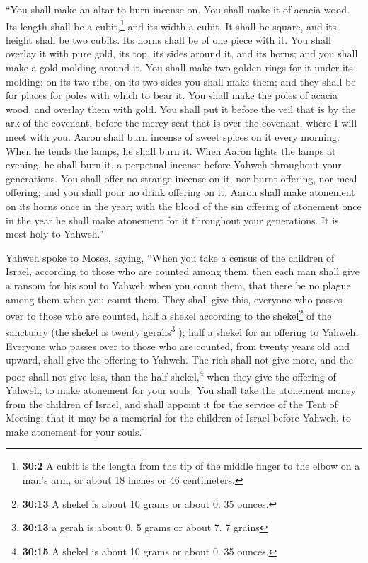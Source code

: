  ``You shall make an altar to burn incense on. You shall
make it of acacia wood.  Its length shall be a
cubit,\footnote{\textbf{30:2} A cubit is the length from the tip of the
  middle finger to the elbow on a man's arm, or about 18 inches or 46
  centimeters.} and its width a cubit. It shall be square, and its
height shall be two cubits. Its horns shall be of one piece with it.
 You shall overlay it with pure gold, its top, its sides
around it, and its horns; and you shall make a gold molding around it.
 You shall make two golden rings for it under its molding;
on its two ribs, on its two sides you shall make them; and they shall be
for places for poles with which to bear it.  You shall
make the poles of acacia wood, and overlay them with gold.
 You shall put it before the veil that is by the ark of
the covenant, before the mercy seat that is over the covenant, where I
will meet with you.  Aaron shall burn incense of sweet
spices on it every morning. When he tends the lamps, he shall burn it.
 When Aaron lights the lamps at evening, he shall burn it,
a perpetual incense before Yahweh throughout your generations.
 You shall offer no strange incense on it, nor burnt
offering, nor meal offering; and you shall pour no drink offering on it.
 Aaron shall make atonement on its horns once in the
year; with the blood of the sin offering of atonement once in the year
he shall make atonement for it throughout your generations. It is most
holy to Yahweh.''

 Yahweh spoke to Moses, saying,  ``When
you take a census of the children of Israel, according to those who are
counted among them, then each man shall give a ransom for his soul to
Yahweh when you count them, that there be no plague among them when you
count them.  They shall give this, everyone who passes
over to those who are counted, half a shekel according to the
shekel\footnote{\textbf{30:13} A shekel is about 10 grams or about 0. 35
  ounces.} of the sanctuary (the shekel is twenty gerahs\footnote{\textbf{30:13}
  a gerah is about 0. 5 grams or about 7. 7 grains} ); half a shekel for
an offering to Yahweh.  Everyone who passes over to those
who are counted, from twenty years old and upward, shall give the
offering to Yahweh.  The rich shall not give more, and
the poor shall not give less, than the half shekel,\footnote{\textbf{30:15}
  A shekel is about 10 grams or about 0. 35 ounces.} when they give the
offering of Yahweh, to make atonement for your souls. 
You shall take the atonement money from the children of Israel, and
shall appoint it for the service of the Tent of Meeting; that it may be
a memorial for the children of Israel before Yahweh, to make atonement
for your souls.''

